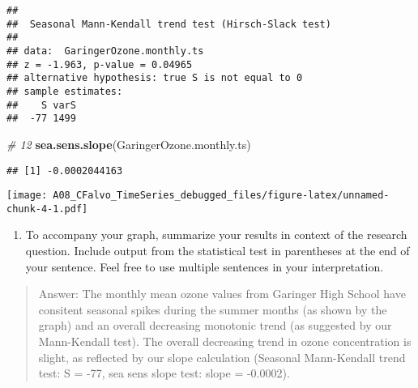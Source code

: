 \documentclass[]{article}
\newenvironment{Shaded}{\begin{snugshade}}{\end{snugshade}}
\newcommand{\CommentTok}[1]{\textcolor[rgb]{0.56,0.35,0.01}{\textit{#1}}}
\newcommand{\DataTypeTok}[1]{\textcolor[rgb]{0.13,0.29,0.53}{#1}}
\newcommand{\FloatTok}[1]{\textcolor[rgb]{0.00,0.00,0.81}{#1}}
\newcommand{\KeywordTok}[1]{\textcolor[rgb]{0.13,0.29,0.53}{\textbf{#1}}}
\newcommand{\NormalTok}[1]{#1}
\newcommand{\OperatorTok}[1]{\textcolor[rgb]{0.81,0.36,0.00}{\textbf{#1}}}
\newcommand{\StringTok}[1]{\textcolor[rgb]{0.31,0.60,0.02}{#1}}
\providecommand{\tightlist}{%
  \setlength{\itemsep}{0pt}\setlength{\parskip}{0pt}}
\begin{document}
\begin{verbatim}
## 
##  Seasonal Mann-Kendall trend test (Hirsch-Slack test)
## 
## data:  GaringerOzone.monthly.ts
## z = -1.963, p-value = 0.04965
## alternative hypothesis: true S is not equal to 0
## sample estimates:
##    S varS 
##  -77 1499
\end{verbatim}

\begin{Shaded}
\begin{Highlighting}[]
\CommentTok{# 12}
\KeywordTok{sea.sens.slope}\NormalTok{(GaringerOzone.monthly.ts)}
\end{Highlighting}
\end{Shaded}

\begin{verbatim}
## [1] -0.0002044163
\end{verbatim}

\begin{Shaded}
\end{Shaded}

\texttt{[image: A08\_CFalvo\_TimeSeries\_debugged\_files/figure-latex/unnamed-chunk-4-1.pdf]}

\begin{enumerate}
\def\labelenumi{\arabic{enumi}.}
\setcounter{enumi}{13}
\tightlist
\item
  To accompany your graph, summarize your results in context of the
  research question. Include output from the statistical test in
  parentheses at the end of your sentence. Feel free to use multiple
  sentences in your interpretation.
\end{enumerate}

\begin{quote}
Answer: The monthly mean ozone values from Garinger High School have
consitent seasonal spikes during the summer months (as shown by the
graph) and an overall decreasing monotonic trend (as suggested by our
Mann-Kendall test). The overall decreasing trend in ozone concentration
is slight, as reflected by our slope calculation (Seasonal Mann-Kendall
trend test: S = -77, sea sens slope test: slope = -0.0002).
\end{quote}
\end{document}
